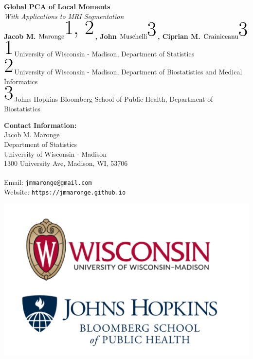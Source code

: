 \documentclass[a0,landscape]{a0poster}
\begin{document}


\begin{minipage}[b]{0.55\linewidth}
\veryHuge \color{uwred} \textbf{Global PCA of Local Moments} \color{jhblue}\\ %
\Huge\textit{With Applications to MRI Segmentation}\\[1cm] %
\huge \textbf{Jacob M. $\text{Maronge}^{\text{\large1, 2}}$, John $\text{Muschelli}^{\text{\large3}}$, Ciprian M. $\text{Crainiceanu}^{\text{\large3}}$}\\ %
\LARGE $^{\text{\large1}}$University of Wisconsin - Madison, Department of Statistics\\
\LARGE $^{\text{\large2}}$University of Wisconsin - Madison, Department of Biostatistics and Medical Informatics\\  %
\LARGE $^{\text{\large3}}$Johns Hopkins Bloomberg School of Public Health, Department of Biostatistics
\end{minipage}
%
\begin{minipage}[b]{0.25\linewidth}
\color{DarkSlateGray}\Large \textbf{Contact Information:}\\
Jacob M. Maronge\\
Department of Statistics\\ %
University of Wisconsin - Madison\\
1300 University Ave, Madison, WI, 53706\\\\
Email: \texttt{jmmaronge@gmail.com}\\ %
Website: \texttt{https://jmmaronge.github.io}
\end{minipage}
%
\begin{minipage}[b]{0.19\linewidth}
\includegraphics[width=23cm]{logo.png} %
\end{minipage}
\end{document}
